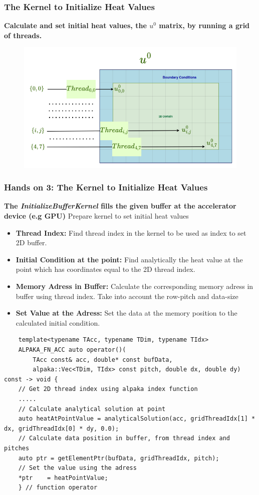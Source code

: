 \documentclass[9pt]{beamer}
\begin{document}
\begin{frame}
\frametitle{The Kernel to Initialize Heat Values}
\textbf{Calculate and set initial heat values, the $u^{0}$ matrix, by running a grid of threads.}
\hspace{2.0\baselineskip}
\begin{figure}
    \centering
    \includegraphics[width=0.8\linewidth]{Screenshot from 2024-09-19 18-45-43.png}
    \label{fig:enter-label}
\end{figure}
\end{frame}

\begin{frame}[fragile]
\frametitle{Hands on 3: The Kernel to Initialize Heat Values}
\small

\textbf{ The \textit{InitializeBufferKernel} fills the given buffer at the accelerator device (e.g GPU)}
    \lstset{basicstyle=\ttfamily\scriptsize}
    Prepare kernel to set initial heat values
    \begin{itemize}
    \item \textbf{Thread Index:} Find thread index in the kernel to be used as index to set 2D buffer.
    \item \textbf{Initial Condition at the point:} Find analytically the heat value at the point which has coordinates equal to the 2D thread index.
    \item \textbf{Memory Adress in Buffer:} Calculate the corresponding memory adress in buffer using thread index. Take into account the row-pitch and data-size
    \item \textbf{Set Value at the Adress:} Set the data at the memory position to the calculated initial condition.
    \end{itemize}
     \lstset{basicstyle=\ttfamily\tiny}
    \begin{lstlisting}
    template<typename TAcc, typename TDim, typename TIdx>
    ALPAKA_FN_ACC auto operator()(
        TAcc const& acc, double* const bufData,
        alpaka::Vec<TDim, TIdx> const pitch, double dx, double dy) const -> void {
    // Get 2D thread index using alpaka index function
    .....
    // Calculate analytical solution at point
    auto heatAtPointValue = analyticalSolution(acc, gridThreadIdx[1] * dx, gridThreadIdx[0] * dy, 0.0);
    // Calculate data position in buffer, from thread index and pitches
    auto ptr = getElementPtr(bufData, gridThreadIdx, pitch);
    // Set the value using the adress
    *ptr    = heatPointValue;
    } // function operator
    \end{lstlisting}

\end{frame}
\end{document}
